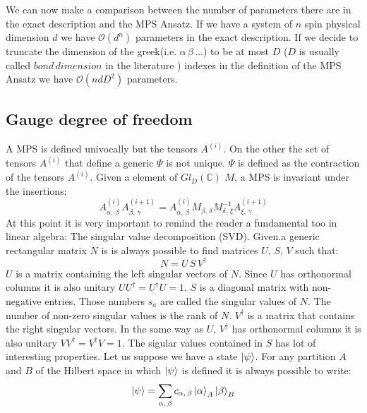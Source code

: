 \documentclass[11pt]{article}
\theoremstyle{definition}
\begin{document}
We can now make a comparison between the number of parameters there are in the exact description and the MPS Ansatz. If we have a system of $n$ spin physical dimension $d$ we have $\mathcal{O}(d^n)$ parameters in the exact description. If we decide to truncate the dimension of the greek(i.e. $\alpha \, \beta \, ...$) to be at most $D$ ($D$ is usually called $bond \, dimension$ in the literature ) indexes in the definition of the MPS Ansatz we have $\mathcal{O}(n d D^2 )$ parameters. \\
\subsection{Gauge degree of freedom}

A MPS is defined univocally but the tensors $A^{(i)}$. On the other the set of tensors $A^{(i)}$ that define a generic $\Psi$ is not unique. $\Psi$ is defined as the contraction of the tensors $A^{(i)}$. 
Given a element of $Gl_D(\mathbb{C})$ $M$, a MPS is invariant under the insertions:
\begin{equation}
A^{(i)}_{\alpha , \, \beta }A^{(i+1)}_{\beta, \, \gamma } = A^{(i)}_{\alpha , \, \beta }M_{{\beta, \, \delta } } M^{-1}_{{\delta , \, \xi } }A^{(i+1)}_{\xi, \, \gamma } 
\end{equation}
At this point it is very important to remind the reader a fundamental too in linear algebra: The singular value decomposition (SVD). Given.a generic rectangular matrix $N$ is is always possible to find matrices $U, \, S, \, V$ such that:
\begin{equation}
N= U\,S\,V^\dag
\end{equation}
$U$ is a matrix containing the left singular vectors of $N$. Since $U$ has orthonormal columns it is also unitary $UU^\dagger=U^\dagger U=1$. $S$ is a diagonal matrix with non-negative entries. Those numbers $s_a$ are called the singular values of $N$. The number of non-zero singular values is the rank of $N$. $V^\dagger$ is a matrix that contains the right singular vectors. In the same way as  $U$, $V^\dagger$ has orthonormal columns it is also unitary $VV^\dagger=V^\dagger V=1$. The sigular values contained in $S$ has lot of interesting properties. Let us suppose we have a state $\ket \psi$. For any partition $A$ and $B$ of the Hilbert space in which $\ket \psi$ is defined it is always possible to write:
\begin{equation}\label{eq:bipartitionsvd}
\ket \psi = \sum_{\alpha, \, \beta} c_{\alpha, \, \beta} \ket{\alpha}_A \ket{\beta}_B
\end{equation}
\end{document}
